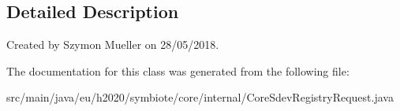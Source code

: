 \subsection{Detailed Description}
Created by Szymon Mueller on 28/05/2018. 

The documentation for this class was generated from the following file\+:\begin{DoxyCompactItemize}
\item 
src/main/java/eu/h2020/symbiote/core/internal/Core\+Sdev\+Registry\+Request.\+java\end{DoxyCompactItemize}

